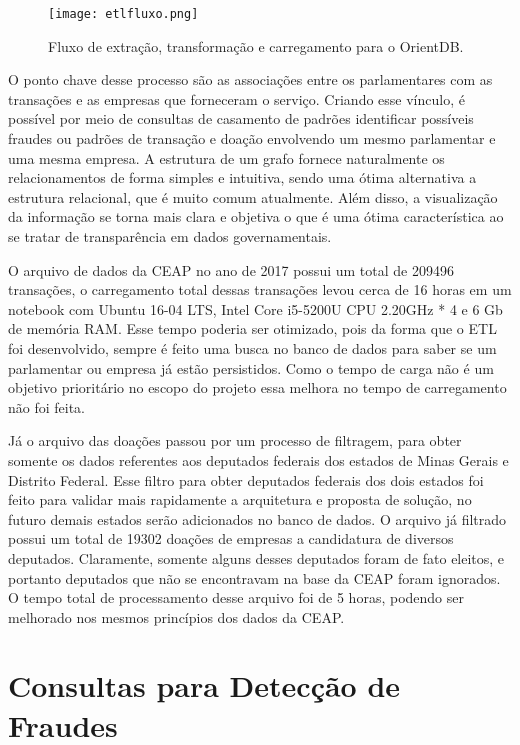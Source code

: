 \begin{figure}[H]
\centering
\texttt{[image: etlfluxo.png]}
\caption{Fluxo de extração, transformação e carregamento para o OrientDB.}
\label{fig:etlfluxo}
\end{figure}

O ponto chave desse processo são as associações entre os parlamentares com as transações e as empresas que forneceram o serviço. Criando esse vínculo, é possível por meio de consultas de casamento de padrões identificar possíveis fraudes ou padrões de transação e doação envolvendo um mesmo parlamentar e uma mesma empresa. A estrutura de um grafo fornece naturalmente os relacionamentos de forma simples e intuitiva, sendo uma ótima alternativa a estrutura relacional, que é muito comum atualmente. Além disso, a visualização da informação se torna mais clara e objetiva o que é uma ótima característica ao se tratar de transparência em dados governamentais.

O arquivo de dados da CEAP no ano de 2017 possui um total de 209496 transações, o carregamento total dessas transações levou cerca de 16 horas em um notebook com Ubuntu 16-04 LTS, Intel Core i5-5200U CPU 2.20GHz * 4 e 6 Gb de memória RAM. Esse tempo poderia ser otimizado, pois da forma que o ETL foi desenvolvido, sempre é feito uma busca no banco de dados para saber se um parlamentar ou empresa já estão persistidos. Como o tempo de carga não é um objetivo prioritário no escopo do projeto essa melhora no tempo de carregamento não foi feita.

Já o arquivo das doações passou por um processo de filtragem, para obter somente os dados referentes aos deputados federais dos estados de Minas Gerais e Distrito Federal. Esse filtro para obter deputados federais dos dois estados foi feito para validar mais rapidamente a arquitetura e proposta de solução, no futuro demais estados serão adicionados no banco de dados. O arquivo já filtrado possui um total de 19302 doações de empresas a candidatura de diversos deputados. Claramente, somente alguns desses deputados foram de fato eleitos, e portanto deputados que não se encontravam na base da CEAP foram ignorados. O tempo total de processamento desse arquivo foi de 5 horas, podendo ser melhorado nos mesmos princípios dos dados da CEAP.

\section{Consultas para Detecção de Fraudes}

